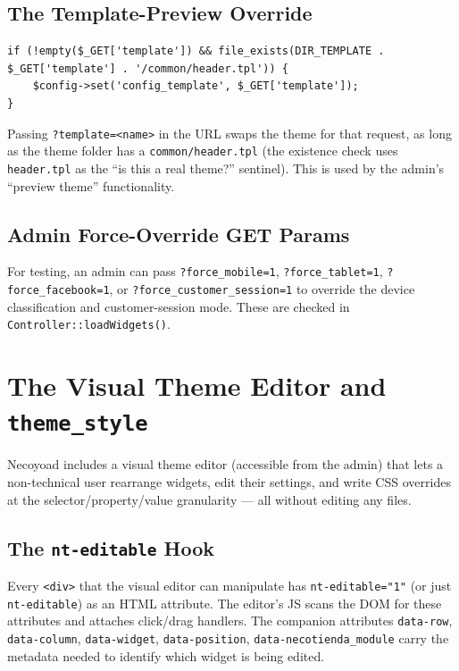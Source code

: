 \documentclass[11pt,a4paper]{article}
\begin{document}
\subsection{The Template-Preview Override}

\begin{lstlisting}[caption={The template-preview override in \texttt{app/shop/map.php}.},label={lst:template-preview}]
if (!empty($_GET['template']) && file_exists(DIR_TEMPLATE . $_GET['template'] . '/common/header.tpl')) {
    $config->set('config_template', $_GET['template']);
}
\end{lstlisting}

Passing \texttt{?template=<name>} in the URL swaps the theme for
that request, as long as the theme folder has a
\texttt{common/header.tpl} (the existence check uses
\texttt{header.tpl} as the ``is this a real theme?'' sentinel).
This is used by the admin's ``preview theme'' functionality.

\subsection{Admin Force-Override GET Params}

For testing, an admin can pass \texttt{?force\_mobile=1},
\texttt{?force\_tablet=1}, \texttt{?force\_facebook=1}, or
\texttt{?force\_customer\_session=1} to override the device
classification and customer-session mode. These are checked in
\texttt{Controller::loadWidgets()}.

\section{The Visual Theme Editor and \texttt{theme\_style}}\label{sec:visual-editor}

Necoyoad includes a visual theme editor (accessible from the
admin) that lets a non-technical user rearrange widgets, edit
their settings, and write CSS overrides at the
selector/property/value granularity --- all without editing any
files.

\subsection{The \texttt{nt-editable} Hook}

Every \texttt{<div>} that the visual editor can manipulate has
\texttt{nt-editable="1"} (or just \texttt{nt-editable}) as an HTML
attribute. The editor's JS scans the DOM for these attributes and
attaches click/drag handlers. The companion attributes
\texttt{data-row}, \texttt{data-column}, \texttt{data-widget},
\texttt{data-position}, \texttt{data-necotienda\_module} carry
the metadata needed to identify which widget is being edited.
\end{document}
